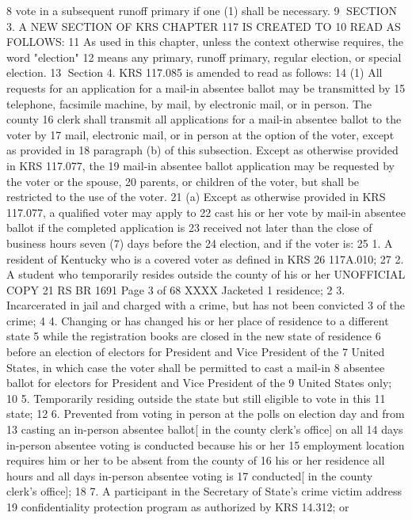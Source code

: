 8 vote in a subsequent runoff primary if one (1) shall be necessary.
9 SECTION 3. A NEW SECTION OF KRS CHAPTER 117 IS CREATED TO
10 READ AS FOLLOWS:
11 As used in this chapter, unless the context otherwise requires, the word "election"
12 means any primary, runoff primary, regular election, or special election.
13 Section 4. KRS 117.085 is amended to read as follows:
14 (1) All requests for an application for a mail-in absentee ballot may be transmitted by
15 telephone, facsimile machine, by mail, by electronic mail, or in person. The county
16 clerk shall transmit all applications for a mail-in absentee ballot to the voter by
17 mail, electronic mail, or in person at the option of the voter, except as provided in
18 paragraph (b) of this subsection. Except as otherwise provided in KRS 117.077, the
19 mail-in absentee ballot application may be requested by the voter or the spouse,
20 parents, or children of the voter, but shall be restricted to the use of the voter.
21 (a) Except as otherwise provided in KRS 117.077, a qualified voter may apply to
22 cast his or her vote by mail-in absentee ballot if the completed application is
23 received not later than the close of business hours seven (7) days before the
24 election, and if the voter is:
25 1. A resident of Kentucky who is a covered voter as defined in KRS
26 117A.010;
27 2. A student who temporarily resides outside the county of his or her 
UNOFFICIAL COPY 21 RS BR 1691
Page 3 of 68
XXXX Jacketed
1 residence;
2 3. Incarcerated in jail and charged with a crime, but has not been convicted
3 of the crime;
4 4. Changing or has changed his or her place of residence to a different state
5 while the registration books are closed in the new state of residence
6 before an election of electors for President and Vice President of the
7 United States, in which case the voter shall be permitted to cast a mail-in
8 absentee ballot for electors for President and Vice President of the
9 United States only;
10 5. Temporarily residing outside the state but still eligible to vote in this
11 state;
12 6. Prevented from voting in person at the polls on election day and from
13 casting an in-person absentee ballot[ in the county clerk's office] on all
14 days in-person absentee voting is conducted because his or her
15 employment location requires him or her to be absent from the county of
16 his or her residence all hours and all days in-person absentee voting is
17 conducted[ in the county clerk's office];
18 7. A participant in the Secretary of State's crime victim address
19 confidentiality protection program as authorized by KRS 14.312; or

